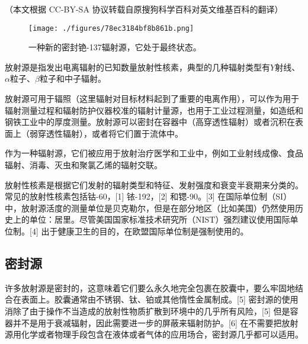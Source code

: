 
（本文根据 CC-BY-SA 协议转载自原搜狗科学百科对英文维基百科的翻译）

\begin{figure}[ht]
\centering
\texttt{[image: ./figures/78ec3184bf8b861b.png]}
\caption{一种新的密封铯-137辐射源，它处于最终状态。} \label{fig_FSY_3}
\end{figure}

放射源是指发出电离辐射的已知数量放射性核素，典型的几种辐射类型有$Y$射线、$\alpha$粒子、$\beta$粒子和中子辐射。

放射源可用于辐照（这里辐射对目标材料起到了重要的电离作用），可以作为用于辐射测量过程和辐射防护仪器校准的辐射计量源，也用于工业过程测量，如造纸和钢铁工业中的厚度测量。放射源可以密封在容器中（高穿透性辐射）或者沉积在表面上（弱穿透性辐射），或者将它们置于流体中。

作为一种辐射源，它们被应用于放射治疗医学和工业中，例如工业射线成像、食品辐射、消毒、灭虫和聚氯乙烯的辐射交联。

放射性核素是根据它们发射的辐射类型和特征、发射强度和衰变半衰期来分类的。常见的放射性核素包括钴-60，[1] 铱-192，[2] 和锶-90。[3] 在国际单位制（SI）中，放射源活度的测量单位是贝克勒尔，但是在部分地区（比如美国）仍然使用历史上的单位：居里。尽管美国国家标准技术研究所（NIST）强烈建议使用国际单位制。[4] 出于健康卫生的目的，在欧盟国际单位制是强制使用的。

\subsection{密封源}
许多放射源是密封的，这意味着它们要么永久地完全包裹在胶囊中，要么牢固地结合在表面上。胶囊通常由不锈钢、钛、铂或其他惰性金属制成。[5] 密封源的使用消除了由于操作不当造成的放射性物质扩散到环境中的几乎所有风险，[5] 但是容器并不是用于衰减辐射，因此需要进一步的屏蔽来辐射防护。[6] 在不需要把放射源用化学或者物理手段包含在液体或者气体的应用场合，密封源几乎都可以适用。

